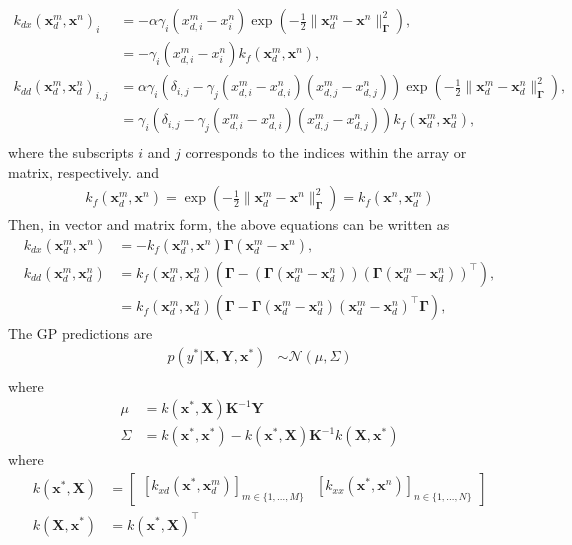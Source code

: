 \documentclass[10pt,oneside,a4paper,notitlepage]{article}
\newcommand{\vect}[1]{\mathbf{#1}}
\begin{document}
\begin{align}
k_{dx}(\vect x_d^m, \vect x^n)_i &= -\alpha\gamma_i(x_{d,i}^m - x_{i}^n) \exp\left(-\frac{1}{2}\|\vect x_d^m - \vect x^n\|_{\boldsymbol{\Gamma}}^2\right),\\
&= -\gamma_i(x_{d,i}^m - x_{i}^n) k_f(\vect x_d^m, \vect x^n) , \\ 
k_{dd}(\vect x_d^m, \vect x_d^n)_{i,j} &= \alpha\gamma_i\left(\delta_{i,j} - \gamma_j(x_{d,i}^m - x_{d,i}^n)(x_{d,j}^m - x_{d,j}^n)\right)\exp\left(-\frac{1}{2}\|\vect x_d^m - \vect x_d^n\|_{\boldsymbol{\Gamma}}^2\right), \\
&= \gamma_i\left(\delta_{i,j} - \gamma_j(x_{d,i}^m - x_{d,i}^n)(x_{d,j}^m - x_{d,j}^n)\right)k_f(\vect x_d^m, \vect x_d^n), \\
\end{align}
where the subscripts $i$ and $j$ corresponds to the indices within the array or matrix, respectively. and 
\begin{align}
k_f(\vect x_d^m, \vect x^n) =  \exp\left(-\frac{1}{2}\|\vect x_d^m - \vect x^n\|_{\boldsymbol{\Gamma}}^2\right) = k_f(\vect x^n, \vect x_d^m) 
\end{align}
Then, in vector and matrix form, the above equations can be written as
\begin{align}
k_{dx}(\vect x_d^m, \vect x^n)&= - k_f(\vect x_d^m, \vect x^n)\boldsymbol\Gamma (\vect x_d^m - \vect x^n),\\ 
k_{dd}(\vect x_d^m, \vect x_d^n) &= k_f(\vect x_d^m, \vect x_d^n)\left(\boldsymbol\Gamma - \left(\boldsymbol\Gamma(\vect x_d^m - \vect x_d^n)\right) \left(\boldsymbol\Gamma(\vect x_d^m - \vect x_d^n)\right)^\top\right) , \\
&= k_f(\vect x_d^m, \vect x_d^n)\left(\boldsymbol\Gamma  - \boldsymbol\Gamma (\vect x_d^m - \vect x_d^n)(\vect x_d^m - \vect x_d^n)^\top\boldsymbol\Gamma\right) ,
\end{align}
The GP predictions are
\begin{align}
p(y^* | \vect X, \vect Y, \vect x^*) &\sim \mathcal N(\mu,\Sigma)\\
\end{align}
where 
\begin{align}
\mu &= k(\vect x^*, \vect X) \vect K^{-1} \vect Y\\
\Sigma &= k(\vect x^*, \vect x^*) - k(\vect x^*, \vect X) \vect K^{-1} k(\vect X, \vect x^*)
\end{align}
where
\begin{align}
k(\vect x^*, \vect X) &= \begin{bmatrix} [k_{xd}(\vect x^*, \vect x_d^m)]_{m\in\{1,\ldots,M\}} & [k_{xx}(\vect x^*, \vect x^n)]_{n\in\{1,\ldots,N\}} \end{bmatrix} \\
k(\vect X, \vect x^*) &= k(\vect x^*, \vect X)^\top 
\end{align}
\end{document}

